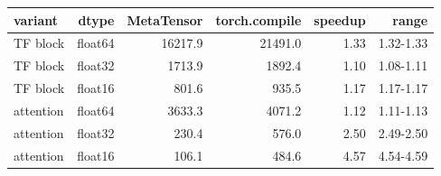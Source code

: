 \begin{tabular}{lrrrrr}
\toprule
variant & dtype & MetaTensor & torch.compile & speedup & range \\
\midrule
TF block & float64 & 16217.9 & 21491.0 & 1.33 & 1.32-1.33 \\
TF block & float32 & 1713.9 & 1892.4 & 1.10 & 1.08-1.11 \\
TF block & float16 & 801.6 & 935.5 & 1.17 & 1.17-1.17 \\
attention & float64 & 3633.3 & 4071.2 & 1.12 & 1.11-1.13 \\
attention & float32 & 230.4 & 576.0 & 2.50 & 2.49-2.50 \\
attention & float16 & 106.1 & 484.6 & 4.57 & 4.54-4.59 \\
\bottomrule
\end{tabular}
